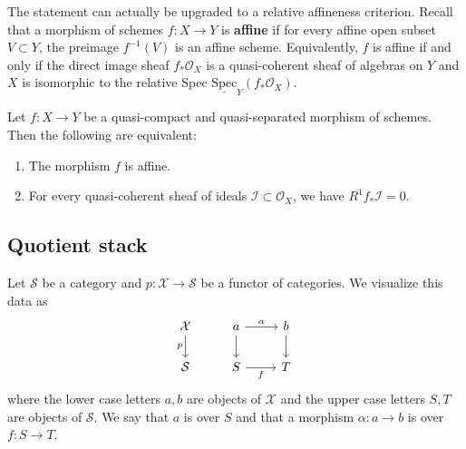 \documentclass[12pt]{article}
\begin{document}
The statement can actually be upgraded to a relative affineness criterion. Recall that a morphism of schemes $f:X\to Y$ is \textbf{affine} if for every affine open subset $V\subset Y$, the preimage $f^{-1}(V)$ is an affine scheme. Equivalently, $f$ is affine if and only if the direct image sheaf $f_*\mathcal{O}_X$ is a quasi-coherent sheaf of algebras on $Y$ and $X$ is isomorphic to the relative Spec $\underline{\mathrm{Spec}}_Y(f_*\mathcal{O}_X)$.
\begin{theorem}
\label{theorem:relative-affine}
Let $f:X\to Y$ be a quasi-compact and quasi-separated morphism of schemes. Then the following are equivalent:
\begin{enumerate}
\item The morphism $f$ is affine.
\item For every quasi-coherent sheaf of ideals $\mathcal{I}\subset\mathcal{O}_X$, we have $R^1f_*\mathcal{I}=0$.
\end{enumerate}
\end{theorem}

\subsection{Quotient stack}
Let $\mathcal{S}$ be a category and $p:\mathcal{X}\to\mathcal{S}$ be a functor of categories.
We visualize this data as
\[
  \begin{tikzcd}
    \mathcal{X} \arrow[d, "p"'] & a \arrow[r, "\alpha"] \arrow[d] & b \arrow[d] \\
    \mathcal{S} & S \arrow[r, "f"'] & T
  \end{tikzcd}
\]
where the lower case letters $a,b$ are objects of $\mathcal{X}$ and the upper case letters $S,T$
are objects of $\mathcal{S}$. We say that $a$ is over $S$ and that a morphism $\alpha: a\to b$ is
over $f:S\to T$.
\end{document}
